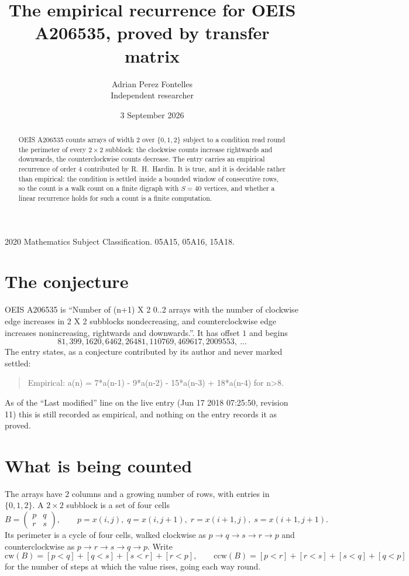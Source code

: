 \documentclass[11pt,a4paper]{article}
\title{The empirical recurrence for OEIS A206535, proved by transfer matrix}
\author{Adrian Perez Fontelles\\ \small Independent researcher}
\date{3 September 2026}
\theoremstyle{plain}
\theoremstyle{definition}
\begin{document}
\maketitle

\begin{abstract}
OEIS A206535 counts arrays of width $2$ over $\{0,1,2\}$ subject to a condition read round the
perimeter of every $2\times2$ subblock: the clockwise counts increase rightwards and downwards, the counterclockwise counts decrease. The entry carries an empirical recurrence of
order $4$ contributed by R.~H.~Hardin. It is true, and it is decidable rather than
empirical: the condition is settled inside a bounded window of consecutive rows, so the
count is a walk count on a finite digraph with $S=40$ vertices, and whether a linear
recurrence holds for such a count is a finite computation.
\end{abstract}

\noindent\small 2020 Mathematics Subject Classification. 05A15, 05A16, 15A18.\normalsize

\section{The conjecture}

OEIS A206535 is ``Number of (n+1) X 2 0..2 arrays with the number of clockwise edge increases in 2 X 2 subblocks nondecreasing, and counterclockwise edge increases nonincreasing, rightwards and downwards.''. It has offset $1$ and begins
\[
81, 399, 1620, 6462, 26481, 110769, 469617, 2009553,\ \dots
\]
The entry states, as a conjecture contributed by its author and never marked settled:
\begin{quote}
Empirical: a(n) = 7*a(n-1) - 9*a(n-2) - 15*a(n-3) + 18*a(n-4) for n>8.
\end{quote}
As of the ``Last modified'' line on the live entry (Jun 17 2018 07:25:50, revision 11) this is still
recorded as empirical, and nothing on the entry records it as proved.

\section{What is being counted}

The arrays have $2$ columns and a growing number of rows, with entries in $\{0,1,2\}$. A
$2\times2$ subblock is a set of four cells
\[
B=\begin{pmatrix} p & q \\ r & s \end{pmatrix},
\qquad p=x(i,j),\; q=x(i,j+1),\; r=x(i+1,j),\; s=x(i+1,j+1).
\]
Its perimeter is a cycle of four cells, walked clockwise as $p\to q\to s\to r\to p$ and
counterclockwise as $p\to r\to s\to q\to p$. Write
\[
\mathrm{cw}(B)=[p<q]+[q<s]+[s<r]+[r<p],\qquad
\mathrm{ccw}(B)=[p<r]+[r<s]+[s<q]+[q<p]
\]
for the number of steps at which the value rises, going each way round.
\end{document}
